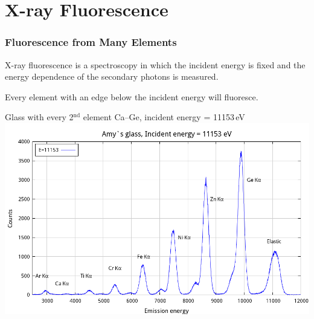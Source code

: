 \documentclass[10pt, xcolor=x11names, compress]{beamer}
\begin{document}
\section[XRF]{X-ray Fluorescence}
\begin{frame}
  \frametitle{Fluorescence from Many Elements}
  X-ray fluorescence is a {\color{Purple4}spectroscopy} in which the
  incident energy is fixed and the energy dependence of the secondary
  photons is measured.

  \bigskip

  Every element with an edge \alert{below} the incident
  energy will fluoresce.

  \begin{center}
    Glass with every 2$^{\mathrm{nd}}$ element Ca--Ge, incident energy = 11153\,eV\\
    \includegraphics[width=0.75\linewidth]{xrf/glass_linear.png}
  \end{center}

\end{frame}
\end{document}
